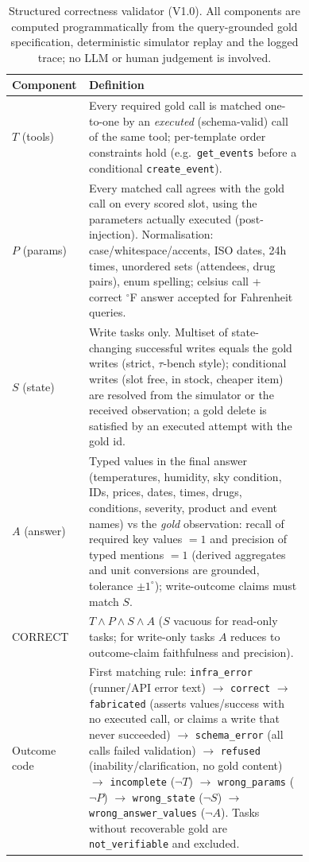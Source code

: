 \begin{table}[t]
\centering
\caption{Structured correctness validator (V1.0). All components are computed programmatically from the query-grounded
gold specification, deterministic simulator replay and the logged trace; no LLM or human judgement is involved.}
\label{tab:validator-def}
\small
\begin{tabular}{@{}lp{0.74\linewidth}@{}}
\toprule
Component & Definition \\
\midrule
$T$ (tools) & Every required gold call is matched one-to-one by an \emph{executed} (schema-valid) call of the same tool; per-template order constraints hold (e.g.\ \texttt{get\_events} before a conditional \texttt{create\_event}). \\
$P$ (params) & Every matched call agrees with the gold call on every scored slot, using the parameters actually executed (post-injection). Normalisation: case/whitespace/accents, ISO dates, 24h times, unordered sets (attendees, drug pairs), enum spelling; celsius call + correct $^\circ$F answer accepted for Fahrenheit queries. \\
$S$ (state) & Write tasks only. Multiset of state-changing successful writes equals the gold writes (strict, $\tau$-bench style); conditional writes (slot free, in stock, cheaper item) are resolved from the simulator or the received observation; a gold delete is satisfied by an executed attempt with the gold id. \\
$A$ (answer) & Typed values in the final answer (temperatures, humidity, sky condition, IDs, prices, dates, times, drugs, conditions, severity, product and event names) vs the \emph{gold} observation: recall of required key values $=1$ and precision of typed mentions $=1$ (derived aggregates and unit conversions are grounded, tolerance $\pm1^\circ$); write-outcome claims must match $S$. \\
CORRECT & $T\wedge P\wedge S\wedge A$ ($S$ vacuous for read-only tasks; for write-only tasks $A$ reduces to outcome-claim faithfulness and precision). \\
\midrule
Outcome code & First matching rule: \texttt{infra\_error} (runner/API error text) $\to$ \texttt{correct} $\to$ \texttt{fabricated} (asserts values/success with no executed call, or claims a write that never succeeded) $\to$ \texttt{schema\_error} (all calls failed validation) $\to$ \texttt{refused} (inability/clarification, no gold content) $\to$ \texttt{incomplete} ($\neg T$) $\to$ \texttt{wrong\_params} ($\neg P$) $\to$ \texttt{wrong\_state} ($\neg S$) $\to$ \texttt{wrong\_answer\_values} ($\neg A$). Tasks without recoverable gold are \texttt{not\_verifiable} and excluded. \\
\bottomrule
\end{tabular}
\end{table}
